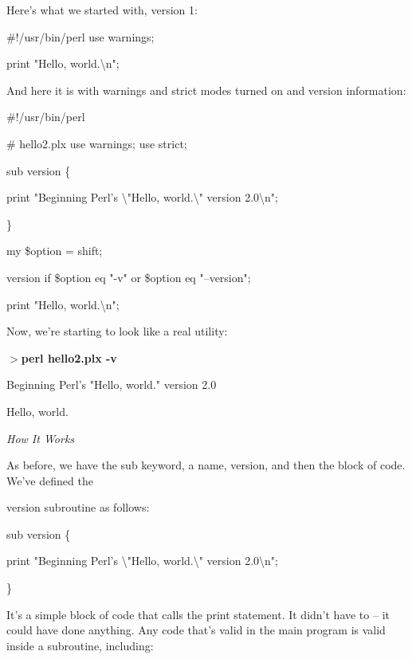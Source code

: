 \documentclass[a4paper,11pt]{book}
\begin{document}
\noindent 

\noindent Here's what we  started with, version 1:

\noindent 

\noindent \#!/usr/bin/perl use warnings;

\noindent print "Hello, world.\textbackslash n";

\noindent 

\noindent And here it is with warnings and strict modes turned on and version information:

\noindent 

\noindent \#!/usr/bin/perl

\noindent \# hello2.plx use warnings; use strict;

\noindent 

\noindent sub version \{

\noindent print "Beginning Perl's \textbackslash "Hello, world.\textbackslash " version 2.0\textbackslash n";

\noindent \}

\noindent 

\noindent my \$option = shift;

\noindent version if \$option eq "-v" or \$option eq "--version";

\noindent print "Hello, world.\textbackslash n";

\noindent 

\noindent Now, we're starting to look like a real utility:

\noindent 

\noindent $>$\textbf{perl hello2.plx -v}

\noindent Beginning Perl's "Hello, world." version 2.0

\noindent Hello, world.

\noindent 

\noindent \textit{How It Works}

\noindent As before, we have the sub keyword, a name, version, and then the block of code. We've defined the

\noindent version subroutine as follows:

\noindent 

\noindent sub version \{

\noindent print "Beginning Perl's \textbackslash "Hello, world.\textbackslash " version 2.0\textbackslash n";

\noindent \}

\noindent 

\noindent It's a simple block of code that calls the print statement. It didn't have to -- it could have done anything. Any code that's valid in the main program is valid inside a subroutine, including:
\end{document}
